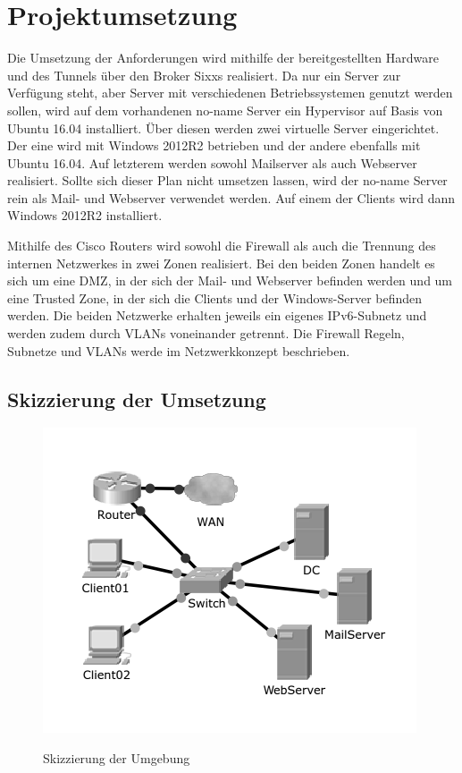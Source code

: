 \section{Projektumsetzung}

Die Umsetzung der Anforderungen wird mithilfe der bereitgestellten Hardware und des Tunnels über den Broker Sixxs realisiert. Da nur ein Server zur Verfügung steht, aber Server mit verschiedenen Betriebssystemen genutzt werden sollen, wird auf dem vorhandenen no-name Server ein Hypervisor auf Basis von Ubuntu 16.04 installiert. Über diesen werden zwei virtuelle Server eingerichtet. Der eine wird mit Windows 2012R2 betrieben und der andere ebenfalls mit Ubuntu 16.04. Auf letzterem werden sowohl Mailserver als auch Webserver realisiert. Sollte sich dieser Plan nicht umsetzen lassen, wird der no-name Server rein als Mail- und Webserver verwendet werden. Auf einem der Clients wird dann Windows 2012R2 installiert.

Mithilfe des Cisco Routers wird sowohl die Firewall als auch die Trennung des internen Netzwerkes in zwei Zonen realisiert. Bei den beiden Zonen handelt es sich um eine DMZ, in der sich der Mail- und Webserver befinden werden und um eine Trusted Zone, in der sich die Clients und der Windows-Server befinden werden. Die beiden Netzwerke erhalten jeweils ein eigenes IPv6-Subnetz und werden zudem durch VLANs voneinander getrennt. Die Firewall Regeln, Subnetze und VLANs werde im Netzwerkkonzept beschrieben.

\subsection{Skizzierung der Umsetzung}

\begin{figure}
\includegraphics[scale=0.5]{../packettracer/8gruppe_netzaufbau.png}
\label{skizzierung-umsetzung}
\caption{Skizzierung der Umgebung}
\end{figure}

